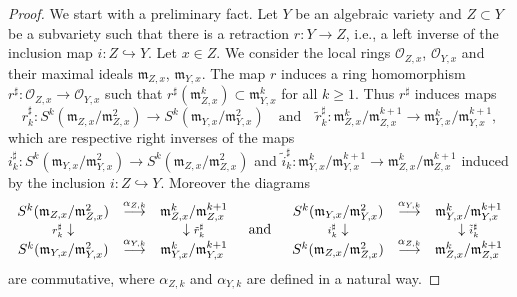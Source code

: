 \documentclass[12pt]{amsart}
\theoremstyle{definition}
\begin{document}
\begin{proof}
We start with a preliminary fact.
Let $Y$ be an algebraic variety and $Z\subset Y$ be a subvariety such that there is a retraction $r:Y\to Z$, i.e., a left inverse of the inclusion map $i:Z\hookrightarrow Y$. Let $x\in Z$.
We consider the local rings $\mathcal{O}_{Z,x}$, $\mathcal{O}_{Y,x}$ and their maximal ideals $\mathfrak{m}_{Z,x}$, $\mathfrak{m}_{Y,x}$.
The map $r$ induces a ring homomorphism  $r^\sharp:\mathcal{O}_{Z,x}\to\mathcal{O}_{Y,x}$ such that
 $r^\sharp(\mathfrak{m}_{Z,x}^k)\subset\mathfrak{m}_{Y,x}^k$ for all $k\geq 1$.  Thus $r^\sharp$ induces maps
\[r^\sharp_k:S^k(\mathfrak{m}_{Z,x}/\mathfrak{m}^2_{Z,x})\to S^k(\mathfrak{m}_{Y,x}/\mathfrak{m}^2_{Y,x})
\quad\mbox{and}\quad
\tilde{r}^\sharp_k:\mathfrak{m}^k_{Z,x}/\mathfrak{m}^{k+1}_{Z,x}\to \mathfrak{m}^k_{Y,x}/\mathfrak{m}^{k+1}_{Y,x},\]
which are respective right inverses of the maps
$i^\sharp_k:S^k(\mathfrak{m}_{Y,x}/\mathfrak{m}^2_{Y,x})\to S^k(\mathfrak{m}_{Z,x}/\mathfrak{m}^2_{Z,x})$
and $\tilde{i}^\sharp_k:\mathfrak{m}^k_{Y,x}/\mathfrak{m}^{k+1}_{Y,x}\to \mathfrak{m}^k_{Z,x}/\mathfrak{m}^{k+1}_{Z,x}$
induced by the inclusion $i:Z\hookrightarrow Y$. Moreover the diagrams
\[
\begin{array}{ccc}
S^k(\mathfrak{m}_{Z,x}/\mathfrak{m}^2_{Z,x}) & \stackrel{\alpha_{Z,k}}{\longrightarrow} & \mathfrak{m}^k_{Z,x}/\mathfrak{m}^{k+1}_{Z,x} \\
\mbox{\scriptsize $r^\sharp_k$}\downarrow & & \downarrow\mbox{\scriptsize $\tilde{r}^\sharp_k$} \\
S^k(\mathfrak{m}_{Y,x}/\mathfrak{m}^2_{Y,x}) & \stackrel{\alpha_{Y,k}}{\longrightarrow} & \mathfrak{m}^k_{Y,x}/\mathfrak{m}^{k+1}_{Y,x}
\end{array}
\quad\mbox{and}\quad
\begin{array}{ccc}
S^k(\mathfrak{m}_{Y,x}/\mathfrak{m}^2_{Y,x}) & \stackrel{\alpha_{Y,k}}{\longrightarrow} & \mathfrak{m}^k_{Y,x}/\mathfrak{m}^{k+1}_{Y,x} \\
\mbox{\scriptsize $i^\sharp_k$}\downarrow & & \downarrow\mbox{\scriptsize $\tilde{i}^\sharp_k$} \\
S^k(\mathfrak{m}_{Z,x}/\mathfrak{m}^2_{Z,x}) & \stackrel{\alpha_{Z,k}}{\longrightarrow} & \mathfrak{m}^k_{Z,x}/\mathfrak{m}^{k+1}_{Z,x}
\end{array}
\]
are commutative, where $\alpha_{Z,k}$ and $\alpha_{Y,k}$ are defined in a natural way.


\end{proof}
\end{document}
